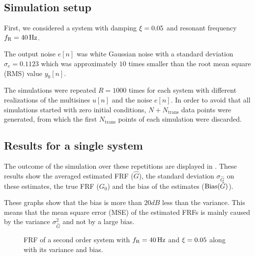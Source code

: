\subsection{Simulation setup}
First, we considered a system with damping $\xi=0.05$ and resonant
frequency $f_{\mathrm{R}} = 40 \,\mathrm{Hz}$.

The output noise $e[n]$ was white Gaussian noise with a standard deviation
$\sigma_e = 0.1123$ which was approximately $10$ times smaller than the
root mean square (RMS) value $y_0[n]$.

The simulations were repeated $R=1000$ times for each system with different realizations of the multisines $u[n]$ and the noise $e[n]$.
In order to avoid that all simulations started with zero initial conditions, $N + N_{\mathrm{trans}}$ data points were generated, from which the first $N_{\mathrm{trans}}$ points of each simulation were discarded. 

\subsection{Results for a single system}
The outcome of the simulation over these repetitions are displayed in .
These results show the averaged estimated FRF ($\hat{G}$), the standard deviation  $\sigma_{\hat{G}}$ on these estimates, the true FRF ($G_0$) and the bias of the estimates ($\operatorname{Bias} (\hat{G})$).

These graphs show that the bias is more than $20 \unit{dB}$ less than the variance.
This means that the mean square error (MSE) of the estimated FRFs is mainly caused by the variance $\sigma_{\hat{G}}^2$ and not by a large bias.

\begin{figure}[hpt]
  \centering
  \setlength{\figurewidth}{0.8\columnwidth}
  \setlength{\figureheight}{5cm}
  
  \caption{FRF of a second order system with $f_{\mathrm{R}}=40\,\mathrm{Hz}$ and $\xi=0.05$ 
           along with its variance and bias.}%
  \label{fig:FRF1}
\end{figure}

